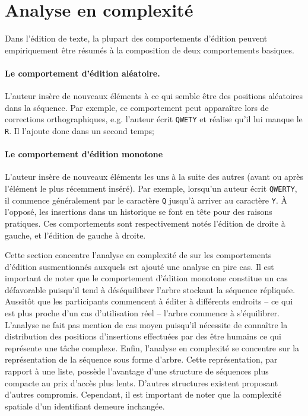 
\section{Analyse en complexité}
\label{repl:sec:complexity}

Dans l'édition de texte, la plupart des comportements d'édition peuvent
empiriquement être résumés à la composition de deux comportements basiques.

\paragraph{Le comportement d'édition aléatoire.} L'auteur insère de nouveaux
éléments à ce qui semble être des positions aléatoires dans la séquence. Par
exemple, ce comportement peut apparaître lors de corrections orthographiques,
e.g. l'auteur écrit \texttt{QWETY} et réalise qu'il lui manque le \texttt{R}. Il
l'ajoute donc dans un second temps;

\paragraph{Le comportement d'édition monotone} L'auteur insère de nouveaux
éléments les uns à la suite des autres (avant ou après l'élément le plus
récemment inséré). Par exemple, lorsqu'un auteur écrit \texttt{QWERTY}, il
commence généralement par le caractère \texttt{Q} jusqu'à arriver au caractère
\texttt{Y}. À l'opposé, les insertions dans un historique se font en tête pour
des raisons pratiques. Ces comportements sont respectivement notés l'édition de
droite à gauche, et l'édition de gauche à droite.

Cette section concentre l'analyse en complexité de \LSEQ sur les comportements
d'édition susmentionnés auxquels est ajouté une analyse en pire cas. Il est
important de noter que le comportement d'édition monotone constitue un cas
défavorable puisqu'il tend à déséquilibrer l'arbre stockant la séquence
répliquée. Aussitôt que les participants commencent à éditer à différents
endroits -- ce qui est plus proche d'un cas d'utilisation réel -- l'arbre
commence à s'équilibrer.%
L'analyse ne fait pas mention de cas moyen puisqu'il nécessite de connaître la
distribution des positions d'insertions effectuées par des être humains ce qui
représente une tâche complexe. Enfin, l'analyse en complexité se concentre sur
la représentation de la séquence sous forme d'arbre. Cette représentation, par
rapport à une liste, possède l'avantage d'une structure de séquences plus
compacte au prix d'accès plus lents.  D'autres structures existent proposant
d'autres compromis. Cependant, il est important de noter que la complexité
spatiale d'un identifiant demeure inchangée.

